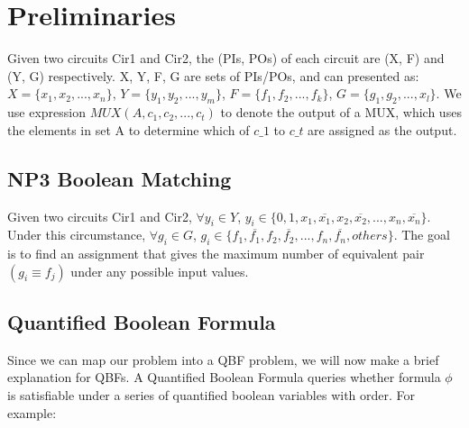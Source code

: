 \section{Preliminaries}
Given two circuits Cir1 and Cir2, the (PIs, POs) of each circuit are (X, F) and (Y, G) respectively. X, Y, F, G are sets of PIs/POs, and can presented as: $X = \{x_1, x_2, ... , x_n\}$, $Y = \{y_1, y_2, ... , y_m\}$, $F = \{f_1, f_2, ... , f_k\}$, $G = \{g_1, g_2, ... , x_l\}$. We use expression $MUX(A, c_1, c_2, ... ,c_t)$ to denote the output of a MUX, which uses the elements in set A to determine which of $c\_1$ to $c\_t$ are assigned as the output.


\subsection{NP3 Boolean Matching}
Given two circuits Cir1 and Cir2, $\forall y_i \in Y$, $ y_i \in \{0, 1, x_1, \overline{x_1}, x_2, \overline{x_2}, ... , x_n, \overline{x_n}\}$. Under this circumstance, $\forall g_i \in G$, $g_i \in \{f_1, \overline{f_1}, f_2, \overline{f_2}, ... , f_n, \overline{f_n}, others\}$. The goal is to find an assignment that gives the maximum number of equivalent pair $(g_i \equiv f_j)$ under any possible input values.

\subsection{Quantified Boolean Formula}
Since we can map our problem into a QBF problem, we will now make a brief explanation for QBFs. A Quantified Boolean Formula queries whether formula $\phi$ is satisfiable under a series of quantified boolean variables with order. For example: 

